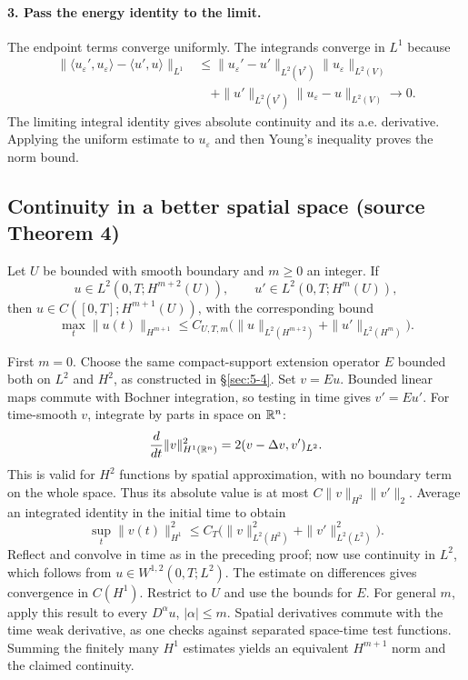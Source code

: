 \begin{expandedproof}
\paragraph{3. Pass the energy identity to the limit.}
The endpoint terms converge uniformly. The integrands converge in $L^1$
because
\[
 \begin{split}
 \|\langle u_\varepsilon',u_\varepsilon\rangle
       -\langle u',u\rangle\|_{L^1}
 &\leq\|u_\varepsilon'-u'\|_{L^2(V^*)}
          \|u_\varepsilon\|_{L^2(V)}\\
 &\quad+\|u'\|_{L^2(V^*)}
          \|u_\varepsilon-u\|_{L^2(V)}\to0.
 \end{split}
\]
The limiting integral identity gives absolute continuity and its a.e.
derivative. Applying the uniform estimate to $u_\varepsilon$ and then
Young's inequality proves the norm bound.
\end{expandedproof}
\Needspace{45mm}

\subsection{Continuity in a better spatial space (source Theorem 4)}
Let $U$ be bounded with smooth boundary and $m\geq0$ an integer.
If
\[
 u\in L^2(0,T;H^{m+2}(U)),\qquad
 u'\in L^2(0,T;H^m(U)),
\]
then $u\in C([0,T];H^{m+1}(U))$, with the corresponding bound
\[
 \max_t\|u(t)\|_{H^{m+1}}
 \leq C_{U,T,m}\bigl(\|u\|_{L^2(H^{m+2})}
                         +\|u'\|_{L^2(H^m)}\bigr).
\]
\begin{expandedproof}
First $m=0$. Choose the same compact-support extension operator $E$
bounded both on $L^2$ and $H^2$, as constructed in
\S\ref{sec:5-4}. Set $v=Eu$. Bounded linear maps commute with Bochner
integration, so testing in time gives $v'=Eu'$.
For time-smooth $v$, integrate by parts in space on $\mathbb{R}^n$:
\[
 \frac d{dt}\|v\|_{H^1(\mathbb{R}^n)}^2
 =2(v-\Delta v,v')_{L^2}.
\]
This is valid for $H^2$ functions by spatial approximation, with no
boundary term on the whole space. Thus its absolute value is at most
$C\|v\|_{H^2}\|v'\|_2$.
Average an integrated identity in the initial time to obtain
\[
 \sup_t\|v(t)\|_{H^1}^2
 \leq C_T\bigl(\|v\|_{L^2(H^2)}^2+\|v'\|_{L^2(L^2)}^2\bigr).
\]
Reflect and convolve in time as in the preceding proof; now use
continuity in $L^2$, which follows from
$u\in W^{1,2}(0,T;L^2)$. The estimate on differences gives convergence
in $C(H^1)$. Restrict to $U$ and use the bounds for $E$.
For general $m$, apply this result to every $D^\alpha u$, $|\alpha|\leq m$.
Spatial derivatives commute with the time weak derivative, as one
checks against separated space-time test functions. Summing the
finitely many $H^1$ estimates yields an equivalent $H^{m+1}$ norm
and the claimed continuity.
\end{expandedproof}
\Needspace{45mm}
